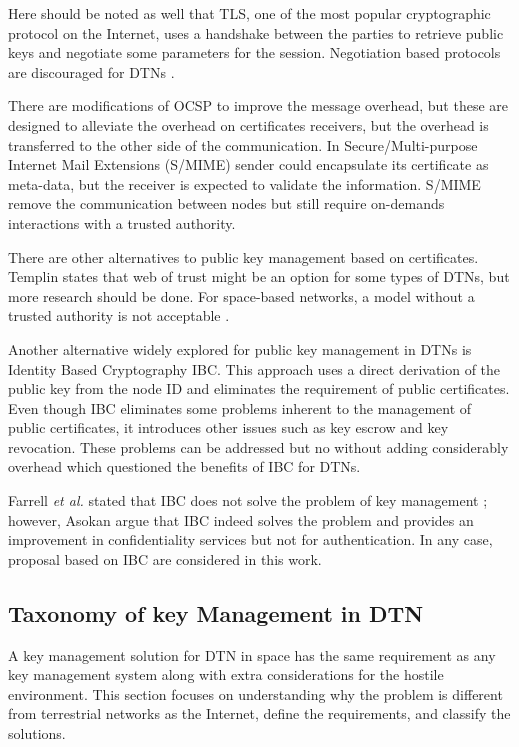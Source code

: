 Here should be noted as well that TLS, one of the most popular cryptographic protocol on the Internet, uses a handshake between the parties to retrieve public keys and negotiate some parameters for the session. Negotiation based protocols are discouraged for DTNs \cite{fall2003delay,cerf2007delay}.

There are modifications of OCSP to improve the message overhead, but these are designed to alleviate the overhead on certificates receivers, but the overhead is transferred to the other side of the communication. In Secure/Multi-purpose Internet Mail Extensions (S/MIME) sender could encapsulate its certificate as meta-data, but the receiver is expected to validate the information. S/MIME remove the communication between nodes but still require on-demands interactions with a trusted authority. 

There are other alternatives to public key management based on certificates. Templin \cite{templin-dtnskmps-00} states that web of trust might be an option for some types of DTNs, but more research should be done. For space-based networks, a model without a trusted authority is not acceptable \cite{viswanathan-dtn-pkdn-00,burleigh-dtnwg-dtka-01,ivancic2009security}.  

Another alternative widely explored for public key management in DTNs is Identity Based Cryptography IBC. This approach uses a direct derivation of the public key from the node ID and eliminates the requirement of public certificates.  Even though IBC eliminates some problems inherent to the management of public certificates, it introduces other issues such as key escrow and key revocation. These problems can be addressed but no without adding considerably overhead which questioned the benefits of IBC for DTNs.


Farrell \textit{et al.} stated that IBC does not solve the problem of key management \cite{irtf-dtnrg-sec-overview-06}; however, Asokan \cite{asokan2007towards} argue that IBC indeed solves the problem and provides an improvement in confidentiality services but not for authentication. In any case, proposal based on IBC are considered in this work.   


\subsection{Taxonomy of key Management in DTN}

A key management solution for DTN in space has the same requirement as any key management system along with extra considerations for the hostile environment. This section focuses on understanding why the problem is different from terrestrial networks as the Internet, define the requirements, and classify the solutions. 




